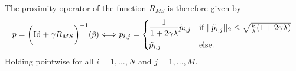        The proximity operator of the function $R_{MS}$ is therefore given by
            \begin{equation}
                p = \bigg( \textnormal{Id} + \gamma R_{MS} \bigg)^{-1}(\tilde{p}) \Longleftrightarrow p_{i,j} =
                \begin{dcases*}
                    \frac{1}{1 + 2\gamma\lambda}\tilde{p}_{i,j} & \textnormal{if $||\tilde{p}_{i,j}||_{2} \le \sqrt{\frac{\nu}{\lambda}(1 + 2\gamma\lambda)}$} \\
                    \tilde{p}_{i,j} & \textnormal{else.}
                \end{dcases*}
                \label{eq:proximity_operator_R}
            \end{equation}
        Holding pointwise for all $i = 1, ..., N$ and $j = 1, ..., M$.

